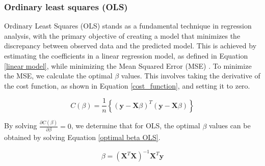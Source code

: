 \subsubsection{Ordinary least squares (OLS)}
\noindent Ordinary Least Squares (OLS) stands as a fundamental technique in 
regression analysis, with the primary objective of creating a model that 
minimizes the discrepancy between observed data and the predicted model. 
This is achieved by estimating the coefficients in a linear regression model, 
as defined in Equation \eqref{linear model}, while minimizing the Mean Squared 
Error (MSE) \cite{AY}. To minimize the MSE, we calculate the optimal $\beta$ values. This involves 
taking the derivative of the cost function, as shown in Equation \eqref{cost_function}, 
and setting it to zero.

\begin{equation}
C(\beta) = \frac{1}{n} \left\lbrace ( \textbf{y} - \textbf{X}\beta )^T (\textbf{y} - \textbf{X}\beta)\right\rbrace \label{cost_function}
\end{equation}

\noindent By solving $\frac{\partial C(\beta)}{\partial \beta} = 0$, we determine that 
for OLS, the optimal $\beta$ values can be obtained by solving Equation
\eqref{optimal beta OLS}.

\begin{equation}
\beta = (\textbf{X}^T \textbf{X})^{-1}\textbf{X}^T \textbf{y} \label{optimal beta OLS}
\end{equation}

